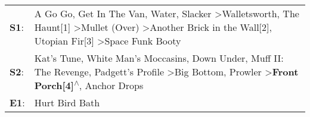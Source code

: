 \begin{supertabular}{p{0.03\textwidth}p{0.92\textwidth}}
 \textbf{S1}:  &  A Go Go\textsuperscript{}, \enspace Get In The Van\textsuperscript{}, \enspace Water\textsuperscript{}, \enspace Slacker\textsuperscript{} \textgreater \enspace Walletsworth\textsuperscript{}, \enspace The Haunt[1]\textsuperscript{} \textgreater \enspace Mullet (Over)\textsuperscript{} \textgreater \enspace Another Brick in the Wall[2]\textsuperscript{}, \enspace Utopian Fir[3]\textsuperscript{} \textgreater \enspace Space Funk Booty\textsuperscript{}  \enspace  \\
 \textbf{S2}:  &                                             Kat's Tune\textsuperscript{}, \enspace White Man's Moccasins\textsuperscript{}, \enspace Down Under\textsuperscript{}, \enspace Muff II: The Revenge\textsuperscript{}, \enspace Padgett's Profile\textsuperscript{} \textgreater \enspace Big Bottom\textsuperscript{}, \enspace Prowler\textsuperscript{} \textgreater \enspace \textbf{Front Porch[4]\textsuperscript{$\wedge$}}, \enspace Anchor Drops\textsuperscript{}  \enspace  \\
 \textbf{E1}:  &                                                                                                                                                                                                                                                                                                                                                                                                                                         Hurt Bird Bath\textsuperscript{}  \enspace  \\
\end{supertabular}
